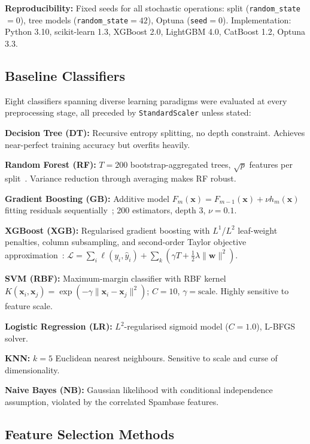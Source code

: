 \documentclass[conference]{IEEEtran}
\begin{document}
\textbf{Reproducibility:} Fixed seeds for all stochastic
operations: split (\texttt{random\_state}$=0$),
tree models (\texttt{random\_state}$=42$), Optuna
(\texttt{seed}$=0$). Implementation: Python 3.10,
scikit-learn 1.3, XGBoost 2.0, LightGBM 4.0, CatBoost 1.2,
Optuna 3.3.

\subsection{Baseline Classifiers}

Eight classifiers spanning diverse learning paradigms were
evaluated at every preprocessing stage, all preceded by
\texttt{StandardScaler} unless stated:

\textbf{Decision Tree (DT):} Recursive entropy splitting,
no depth constraint. Achieves near-perfect training accuracy
but overfits heavily.

\textbf{Random Forest (RF):} $T=200$ bootstrap-aggregated
trees, $\sqrt{p}$ features per split~\cite{ref16}. Variance
reduction through averaging makes RF robust.

\textbf{Gradient Boosting (GB):} Additive model
$F_m(\mathbf{x})=F_{m-1}(\mathbf{x})+\nu h_m(\mathbf{x})$
fitting residuals sequentially~\cite{ref9}; 200 estimators,
depth 3, $\nu=0.1$.

\textbf{XGBoost (XGB):} Regularised gradient boosting with
$L^1$/$L^2$ leaf-weight penalties, column subsampling, and
second-order Taylor objective approximation~\cite{ref6}:
$\mathcal{L}=\sum_i\ell(y_i,\hat{y}_i)+\sum_k(\gamma T
+\frac{1}{2}\lambda\|\mathbf{w}\|^2)$.

\textbf{SVM (RBF):} Maximum-margin classifier with RBF kernel
$K(\mathbf{x}_i,\mathbf{x}_j)=\exp(-\gamma\|\mathbf{x}_i
-\mathbf{x}_j\|^2)$; $C=10$, $\gamma{=}\text{scale}$. Highly
sensitive to feature scale.

\textbf{Logistic Regression (LR):} $L^2$-regularised
sigmoid model ($C=1.0$), L-BFGS solver.

\textbf{KNN:} $k=5$ Euclidean nearest neighbours. Sensitive
to scale and curse of dimensionality.

\textbf{Naive Bayes (NB):} Gaussian likelihood with
conditional independence assumption, violated by the
correlated Spambase features.

\subsection{Feature Selection Methods}
\end{document}
